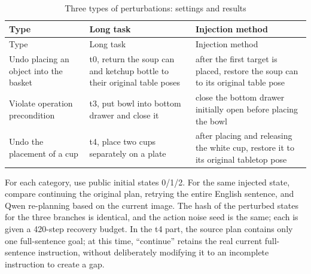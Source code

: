 \FloatBarrier\begingroup\small\setlength{\tabcolsep}{2.5pt}
\begin{longtable}[]{@{}
  >{\raggedright\arraybackslash}p{}
  >{\raggedright\arraybackslash}p{}
  >{\raggedright\arraybackslash}p{}@{}}
\caption{Three types of perturbations: settings and results}\label{tab:s10-5}\tabularnewline
\toprule\noalign{}
\begin{minipage}[b]{\linewidth}\raggedright
Type
\end{minipage} & \begin{minipage}[b]{\linewidth}\raggedright
Long task
\end{minipage} & \begin{minipage}[b]{\linewidth}\raggedright
Injection method
\end{minipage} \\
\midrule\noalign{}
\endfirsthead
\toprule\noalign{}
\begin{minipage}[b]{\linewidth}\raggedright
Type
\end{minipage} & \begin{minipage}[b]{\linewidth}\raggedright
Long task
\end{minipage} & \begin{minipage}[b]{\linewidth}\raggedright
Injection method
\end{minipage} \\
\midrule\noalign{}
\endhead
\bottomrule\noalign{}
\endlastfoot
Undo placing an object into the basket & t0, return the soup can and ketchup bottle to their original table poses & after the first target is placed, restore the soup can to its original table pose \\
Violate operation precondition & t3, put bowl into bottom drawer and close it & close the bottom drawer initially open before placing the bowl \\
Undo the placement of a cup & t4, place two cups separately on a plate & after placing and releasing the white cup, restore it to its original tabletop pose \\
\end{longtable}\endgroup

For each category, use public initial states 0/1/2. For the same injected state, compare continuing the original plan, retrying the entire English sentence, and Qwen re-planning based on the current image. The hash of the perturbed states for the three branches is identical, and the action noise seed is the same; each is given a 420-step recovery budget. In the t4 part, the source plan contains only one full-sentence goal; at this time, ``continue'' retains the real current full-sentence instruction, without deliberately modifying it to an incomplete instruction to create a gap.


